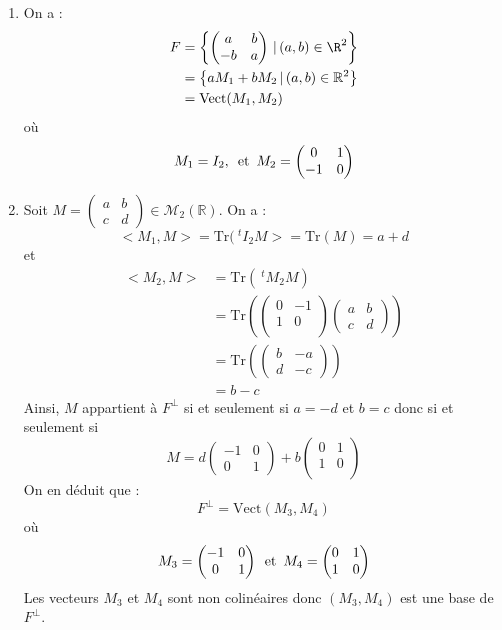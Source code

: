 \documentclass[a4paper,10pt]{report}
\begin{document}
\begin{enumerate}
\item On a :
\begin{align*}
F & =\left \lbrace \begin{pmatrix} a & b\\ -b & a \end{pmatrix} \, \vert \,  (a,b)\in\R^2\right\rbrace \\
& = \left\lbrace aM_1+bM_2 \, \vert \, (a,b) \in \mathbb{R}^2 \right\rbrace \\
& = \textrm{Vect}(M_1,M_2)
\end{align*}
où
$$ M_1 = I_2, \, \hbox{ et } \, M_2 = \begin{pmatrix}
0 & 1 \\
-1 & 0 \\
\end{pmatrix}$$
\item Soit $M = \begin{pmatrix}
a & b \\
c & d 
\end{pmatrix} \in \mathcal{M}_2(\mathbb{R})$. On a :
$$<M_1,M> = \textrm{Tr}(~^tI_2 M> = \textrm{Tr}(M) = a+d$$
et 
\begin{align*}
<M_2,M> & = \textrm{Tr}(~^t M_2M) \\
& = \textrm{Tr} \left( \begin{pmatrix}
0 & -1 \\
1 & 0 \\
\end{pmatrix}  \begin{pmatrix}
a & b \\
c & d 
\end{pmatrix}  \right)   \\
& =  \textrm{Tr} \left( \begin{pmatrix}
b & -a \\
d & -c
\end{pmatrix} \right) \\
& = b-c
\end{align*}
Ainsi, $M$ appartient à $F^{\perp}$ si et seulement si $a=-d$ et $b=c$ donc si et seulement si 
$$ M = d \begin{pmatrix}
-1 & 0 \\
0 & 1 
\end{pmatrix} + b \begin{pmatrix}
0 & 1 \\
1 & 0 \\
\end{pmatrix}$$
On en déduit que :
$$ F^{\perp} = \textrm{Vect}(M_3,M_4)$$
où
$$ M_3 = \begin{pmatrix}
-1 & 0 \\
0 & 1 
\end{pmatrix} \, \hbox{ et } \, M_4 = \begin{pmatrix}
0 & 1 \\
1 & 0 
\end{pmatrix}$$
Les vecteurs $M_3$ et $M_4$ sont non colinéaires donc $(M_3,M_4)$ est une base de $F^{\perp}$.


\end{enumerate}
\end{document}
